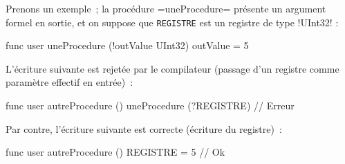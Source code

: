 Prenons un exemple~; la procédure \plm=uneProcedure= présente un argument formel en sortie, et on suppose que \texttt{REGISTRE} est un registre de type \plm!UInt32! :
\begin{PLM}
func user uneProcedure (!outValue UInt32) {
  outValue = 5
}
\end{PLM}



L'écriture suivante est rejetée par le compilateur (passage d'un registre comme paramètre effectif en entrée)~:
\begin{PLM}
func user autreProcedure () {
  uneProcedure (?REGISTRE) // Erreur
}
\end{PLM}

Par contre, l'écriture suivante est correcte (écriture du registre)~:
\begin{PLM}
func user autreProcedure () {
  REGISTRE = 5 // Ok
}
\end{PLM}

